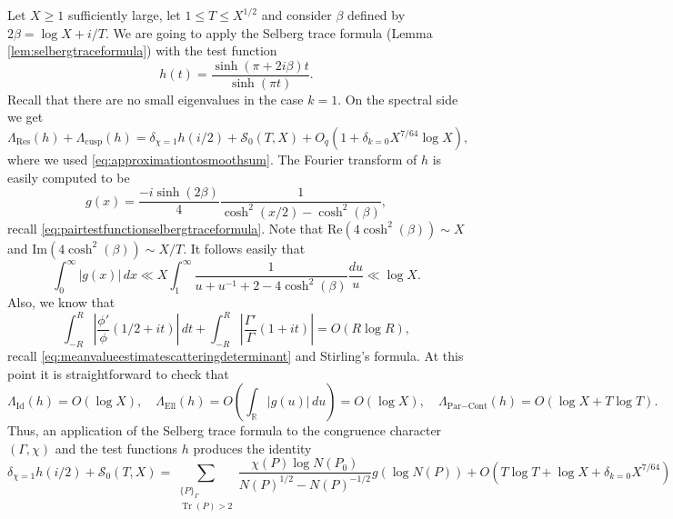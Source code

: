 \documentclass{article}
\theoremstyle{named}
\renewcommand{\S}{\mathcal{S}}
\newcommand{\R}{\mathbb{R}}
\DeclareMathOperator{\Tr}{Tr}
\begin{document}
Let $X \geq 1$ sufficiently large, let $1 \leq T \leq X^{1/2}$ and consider $\beta$ defined by $2\beta = \log X + i/T$. We are going to apply the Selberg trace formula (Lemma \ref{lem:selbergtraceformula}) with the test function
\begin{equation*}
    h(t) = \frac{\sinh(\pi + 2i\beta)t}{\sinh(\pi t)}.
\end{equation*}
Recall that there are no small eigenvalues in the case $k = 1$. On the spectral side we get
\begin{equation*}
    \Lambda_{\text{Res}}(h) + \Lambda_{\text{cusp}}(h) = \delta_{\chi = 1}h(i/2) + \S_0(T, X) + O_q(1 + \delta_{k = 0} X^{7/64}\log X),
\end{equation*}
where we used \eqref{eq:approximationtosmoothsum}.
The Fourier transform of $h$ is easily computed to be 
\begin{equation*}
    g(x) = \frac{-i\sinh(2\beta)}{4}\frac{1}{\cosh^2(x/2) - \cosh^2(\beta)},
\end{equation*}
recall \eqref{eq:pairtestfunctionselbergtraceformula}. Note that $\text{Re}(4\cosh^2(\beta)) \sim X$ and $\text{Im}(4\cosh^2(\beta)) \sim X/T$. It follows easily that 
\begin{equation*}
\int_0^\infty |g(x)|\, dx \ll X \int_1^\infty \frac{1}{u + u^{-1} + 2 - 4\cosh^2(\beta)} \frac{du}{u} \ll \log X.
\end{equation*}
Also, we know that   
\begin{equation*}
    \int_{-R}^{R}\left|\frac{\phi'}{\phi}(1/2 + it)\right|\, dt + \int_{-R}^{R}\left|\frac{\Gamma'}{\Gamma}(1 + it)\right|= O(R\log R),
\end{equation*}
recall \eqref{eq:meanvalueestimatescatteringdeterminant} and Stirling's formula. At this point it is straightforward to check that
\begin{equation*}
    \Lambda_{\text{Id}}(h) = O(\log X), \quad \Lambda_{\text{Ell}}(h) = O\left( \int_\R |g(u)| \, du\right) = O(\log X), \quad \Lambda_{\text{Par} - \text{Cont}}(h) = O(\log X + T\log T).
\end{equation*}
Thus, an application of the Selberg trace formula to the congruence character $(\Gamma, \chi)$ and the test functions $h$ produces the identity
\begin{equation}\label{eq:evaluationselbergtraceformulav1}
    \delta_{\chi = 1}h(i/2) + \S_0(T, X) = \sum_{\substack{\{P\}_\Gamma\\
    \Tr(P) > 2}}\frac{\chi(P)\log N(P_0)}{N(P)^{1/2} - N(P)^{-1/2}}g(\log N(P)) + O(T\log T + \log X + \delta_{k = 0}X^{7/64})
\end{equation}
\end{document}
